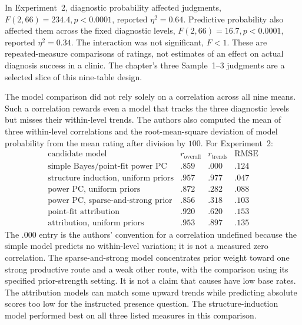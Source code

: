 In Experiment~2, diagnostic probability affected judgments,
\(F(2,66)=234.4,p<0.0001\), reported \(\eta^2=0.64\).
Predictive probability also affected them across the fixed diagnostic
levels, \(F(2,66)=16.7,p<0.0001\), reported \(\eta^2=0.34\).
The interaction was not significant, \(F<1\).
These are repeated-measure comparisons of ratings, not estimates of an
effect on actual diagnosis success in a clinic. The chapter's three
Sample~1--3 judgments are a selected slice of this nine-table design.
\cite[fig.~5 and p.~290]{MederMayrhoferWaldmann2014StructureInduction}

The model comparison did not rely solely on a correlation across all
nine means. Such a correlation rewards even a model that tracks the three
diagnostic levels but misses their within-level trends. The authors also
computed the mean of three within-level correlations and the
root-mean-square deviation of model probability from the mean rating
after division by \(100\). For Experiment~2:
\[
\begin{array}{l|rrr}
 \text{candidate model}&r_{\mathrm{overall}}&r_{\mathrm{trends}}&\mathrm{RMSE}\\\hline
 \text{simple Bayes/point-fit power PC}&.859&.000&.124\\
 \text{structure induction, uniform priors}&.957&.977&.047\\
 \text{power PC, uniform priors}&.872&.282&.088\\
 \text{power PC, sparse-and-strong prior}&.856&.318&.103\\
 \text{point-fit attribution}&.920&.620&.153\\
 \text{attribution, uniform priors}&.953&.897&.135
\end{array}
\]
The \(.000\) entry is the authors' convention for a correlation undefined
because the simple model predicts no within-level variation; it is not a
measured zero correlation. The sparse-and-strong model concentrates prior
weight toward one strong productive route and a weak other route, with
the comparison using its specified prior-strength setting. It is not a
claim that causes have low base rates. The attribution models can match
some upward trends while predicting absolute scores too low for the
instructed presence question. The structure-induction model performed
best on all three listed measures in this comparison.
\cite[pp.~287--292, table~2 and Appendices~B--C]
 {MederMayrhoferWaldmann2014StructureInduction}

